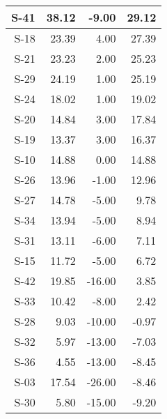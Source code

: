 \begin{tabular}{ | r | r | r | r | }
    \hline
                  S-41  &           38.12  &           -9.00  &           29.12  \\
    \hline
                  S-18  &           23.39  &            4.00  &           27.39  \\
    \hline
                  S-21  &           23.23  &            2.00  &           25.23  \\
    \hline
                  S-29  &           24.19  &            1.00  &           25.19  \\
    \hline
                  S-24  &           18.02  &            1.00  &           19.02  \\
    \hline
                  S-20  &           14.84  &            3.00  &           17.84  \\
    \hline
                  S-19  &           13.37  &            3.00  &           16.37  \\
    \hline
                  S-10  &           14.88  &            0.00  &           14.88  \\
    \hline
                  S-26  &           13.96  &           -1.00  &           12.96  \\
    \hline
                  S-27  &           14.78  &           -5.00  &            9.78  \\
    \hline
                  S-34  &           13.94  &           -5.00  &            8.94  \\
    \hline
                  S-31  &           13.11  &           -6.00  &            7.11  \\
    \hline
                  S-15  &           11.72  &           -5.00  &            6.72  \\
    \hline
                  S-42  &           19.85  &          -16.00  &            3.85  \\
    \hline
                  S-33  &           10.42  &           -8.00  &            2.42  \\
    \hline
                  S-28  &            9.03  &          -10.00  &           -0.97  \\
    \hline
                  S-32  &            5.97  &          -13.00  &           -7.03  \\
    \hline
                  S-36  &            4.55  &          -13.00  &           -8.45  \\
    \hline
                  S-03  &           17.54  &          -26.00  &           -8.46  \\
    \hline
                  S-30  &            5.80  &          -15.00  &           -9.20  \\

\end{tabular}
